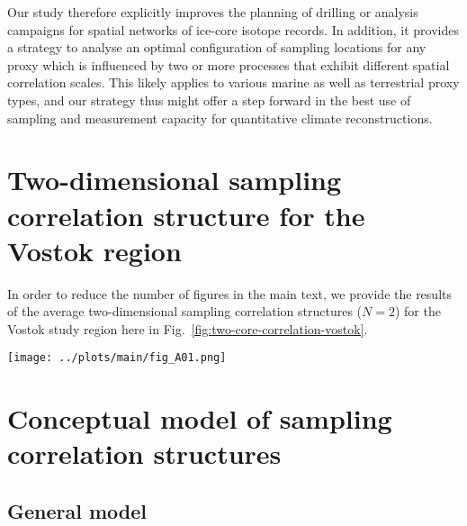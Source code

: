 \documentclass[cp, manuscript]{copernicus}
\begin{document}
Our study therefore explicitly improves the planning of drilling or analysis
campaigns for spatial networks of ice-core isotope records. In addition, it
provides a strategy to analyse an optimal configuration of sampling locations
for any proxy which is influenced by two or more processes that exhibit
different spatial correlation scales. This likely applies to various marine as
well as terrestrial proxy types, and our strategy thus might offer a step
forward in the best use of sampling and measurement capacity for quantitative
climate reconstructions.


\appendix

\section{Two-dimensional sampling correlation structure for the Vostok region}
\label{app:vostok.n2}

In order to reduce the number of figures in the main text, we provide the
results of the average two-dimensional sampling correlation structures ($N=2$)
for the Vostok study region here in Fig.~\ref{fig:two-core-correlation-vostok}.

\begin{figure*}[t]%
\centering
\texttt{[image: ../plots/main/fig\_A01.png]}
\caption{%
  Same as Fig.~\ref{fig:two-core-correlation} but for the Vostok region. Note
  that for $\delta^{18}\mathrm{O}^{\mathrm{(pw)}}$ the -- albeit marginal --
  correlation maximum is achieved by combining the innermost ring with the ring
  between $500$--$750$\,km.}
\label{fig:two-core-correlation-vostok}%
\end{figure*}%

\section{Conceptual model of sampling correlation structures}
\label{app:concept.model}

\subsection{General model}
\label{app:concept.model.general}
\end{document}
